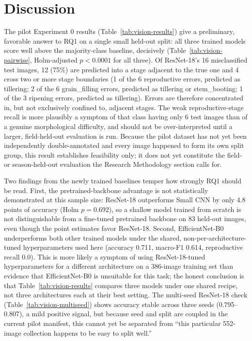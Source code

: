 \documentclass[conference]{IEEEtran}
\begin{document}
\section{Discussion}
The pilot Experiment 0 results (Table~\ref{tab:vision-results}) give a preliminary, favorable answer to RQ1 on a single small held-out split: all three trained models score well above the majority-class baseline, decisively (Table~\ref{tab:vision-pairwise}, Holm-adjusted $p<0.0001$ for all three). Of ResNet-18's 16 misclassified test images, 12 (75\%) are predicted into a stage adjacent to the true one and 4 cross two or more stage boundaries (1 of the 6 reproductive errors, predicted as tillering; 2 of the 6 grain\_filling errors, predicted as tillering or stem\_booting; 1 of the 3 ripening errors, predicted as tillering). Errors are therefore concentrated in, but not exclusively confined to, adjacent stages. The weak reproductive-stage recall is more plausibly a symptom of that class having only 6 test images than of a genuine morphological difficulty, and should not be over-interpreted until a larger, field-held-out evaluation is run. Because the pilot dataset has not yet been independently double-annotated and every image happened to form its own split group, this result establishes feasibility only; it does not yet constitute the field- or season-held-out evaluation the Research Methodology section calls for.

Two findings from the newly trained baselines temper how strongly RQ1 should be read. First, the pretrained-backbone advantage is not statistically demonstrated at this sample size: ResNet-18 outperforms Small CNN by only 4.8 points of accuracy (Holm $p=0.692$), so a shallow model trained from scratch is not distinguishable from a fine-tuned pretrained backbone on 83 held-out images, even though the point estimates favor ResNet-18. Second, EfficientNet-B0 underperforms both other trained models under the shared, non-per-architecture-tuned hyperparameters used here (accuracy 0.711, macro-F1 0.614, reproductive recall 0.0). This is more likely a symptom of using ResNet-18-tuned hyperparameters for a different architecture on a 386-image training set than evidence that EfficientNet-B0 is unsuitable for this task; the honest conclusion is that Table~\ref{tab:vision-results} compares three models under one shared recipe, not three architectures each at their best setting. The multi-seed ResNet-18 check (Table~\ref{tab:vision-multiseed}) shows accuracy stable across three seeds (0.795--0.807), a mild positive signal, but because seed and split are coupled in the current pilot manifest, this cannot yet be separated from ``this particular 552-image collection happens to be easy to split well.''
\end{document}
